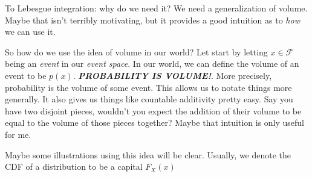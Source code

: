 \documentclass[10pt]{article}
\newcommand{\F}{\mathcal{F}}
\begin{document}
To Lebesgue integration: why do we need it? We need a generalization of volume. Maybe that isn't terribly motivating, but it provides a good intuition as to \textit{how} we can use it.

So how do we use the idea of volume in our world? Let start by letting $x\in \F$ being an \textit{event} in our \textit{event space}. In our world, we can define the volume of an event to be $p(x)$. \textbf{\textit{PROBABILITY IS VOLUME!}}. More precisely, probability is the volume of some event. This allows us to notate things more generally. It also gives us things like countable additivity pretty easy. Say you have two disjoint pieces, wouldn't you expect the addition of their volume to be equal to the volume of those pieces together? Maybe that intuition is only useful for me.

Maybe some illustrations using this idea will be clear. Usually, we denote the CDF of a distribution to be a capital $F_X(x)$ 

\newpage
\end{document}
